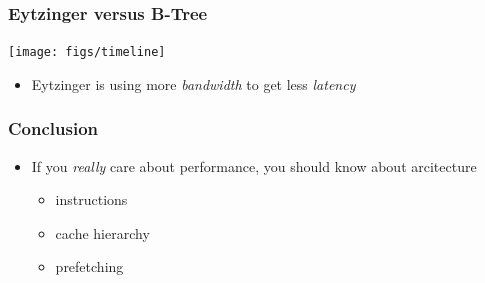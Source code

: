 \documentclass[xcolor=dvipsnames]{beamer}
\begin{document}
\begin{frame}
  \frametitle{Eytzinger versus B-Tree}

  \begin{center}
    \texttt{[image: figs/timeline]}
  \end{center}
  \vspace{-1em}
  \begin{itemize}[<2->]
     \item Eytzinger is using more \emph{bandwidth} to get less \emph{latency} 
  \end{itemize}
\end{frame}


\begin{frame}
  \frametitle{Conclusion}

  \begin{itemize}[<+->]
    \item If you \emph{really} care about performance, you should know
       about arcitecture
    \begin{itemize}[<+->]
     \item instructions
     \item cache hierarchy
     \item prefetching
        
    \end{itemize}
    
  \end{itemize}
\end{frame}
\end{document}
